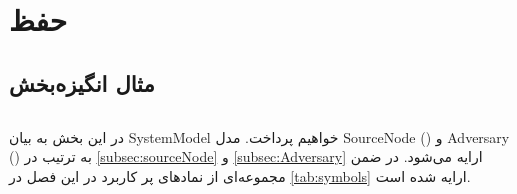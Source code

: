 \chapter{حفظ  }
\label{chap:ratePrivacy}
\begin{abstract}

\end{abstract}


\section{مثال انگیزه‌بخش}
\label{sec:motivatingExample}


\section{}
\label{sec:systemModel}
در این بخش به بیان 
\gls{SystemModel}
خواهیم پرداخت. مدل
\gls{SourceNode} () و \gls{Adversary} ()
به ترتیب در 
\autoref{subsec:sourceNode} و \autoref{subsec:Adversary}
ارایه می‌شود. در ضمن مجموعه‌ای از نمادهای پر کاربرد  در این فصل در 
\autoref{tab:symbols}
ارایه شده است. 

